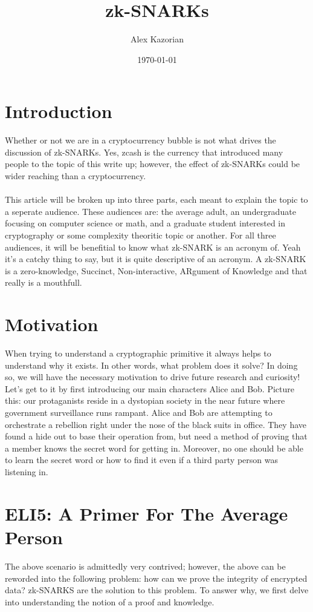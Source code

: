 \documentclass{article}
\title{zk-SNARKs}
\author{Alex Kazorian}
\date{\today}
\begin{document}
\maketitle
\section{Introduction}
Whether or not we are in a cryptocurrency bubble is not what drives the discussion of zk-SNARKs. Yes, zcash is the currency that introduced many people to the topic of this write up; however, the effect of zk-SNARKs could be wider reaching than a cryptocurrency. \\ \\
\noindent This article will be broken up into three parts, each meant to explain the topic to a seperate audience. These audiences are: the average adult, an undergraduate focusing on computer science or math, and a graduate student interested in cryptography or some complexity theoritic topic or another. For all three audiences, it will be benefitial to know what zk-SNARK is an acronym of. Yeah it's a catchy thing to say, but it is quite descriptive of an acronym. A zk-SNARK is a zero-knowledge, Succinct, Non-interactive, ARgument of Knowledge and that really is a mouthfull.

\section{Motivation}
When trying to understand a cryptographic primitive it always helps to understand why it exists. In other words, what problem does it solve? In doing so, we will have the necessary motivation to drive future research and curiosity! Let's get to it by first introducing our main characters Alice and Bob. Picture this: our protaganists reside in a dystopian society in the near future where government surveillance runs rampant. Alice and Bob are attempting to orchestrate a rebellion right under the nose of the black suits in office. They have found a hide out to base their operation from, but need a method of proving that a member knows the secret word for getting in. Moreover, no one should be able to learn the secret word or how to find it even if a third party person was listening in.
\section{ELI5: A Primer For The Average Person}
The above scenario is admittedly very contrived; however, the above can be reworded into the following problem: how can we prove the integrity of encrypted data? zk-SNARKS are the solution to this problem. To answer why, we first delve into understanding the notion of a proof and knowledge.
\end{document}
